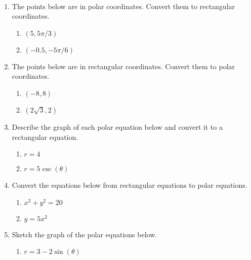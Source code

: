 \documentclass[11pt]{amsart}
\newcommand{\ds}{\displaystyle}
\begin{document}
\begin{center}
  \large
  \\
   
\end{center}

\begin{enumerate}
\item The points below are in polar coordinates. Convert them to rectangular coordinates.
	\begin{enumerate}
	\item $\ds (5, 5 \pi/3)$\\
	\vfill
	\item $\ds (-0.5, -5 \pi /6)$\\
	\vfill
	\end{enumerate}
\item The points below are in rectangular coordinates. Convert them to polar coordinates.
	\begin{enumerate}
	\item $\ds (-8,8)$\\
	\vfill
	\item $\ds (2\sqrt{3},2)$\\
	\vfill
	\end{enumerate}
\item Describe the graph of each polar equation below and convert it to a rectangular equation.	
	\begin{enumerate}
	\item $\ds r=4$\\
	\vfill
	\item $\ds r=5\csc(\theta)$\\
	\vfill
	\end{enumerate}
\newpage
\item Convert the equations below from rectangular equations to polar equations.
 	\begin{enumerate}
	\item $\ds x^2+y^2=20$\\
	\vfill
	\item $\ds y=5x^2$\\
	\vfill
	\end{enumerate}
\item Sketch the graph of the polar equations below.
	\begin{enumerate}
	\item $\ds r=3-2\sin(\theta)$
	

\end{enumerate}
\end{enumerate}
\end{document}
